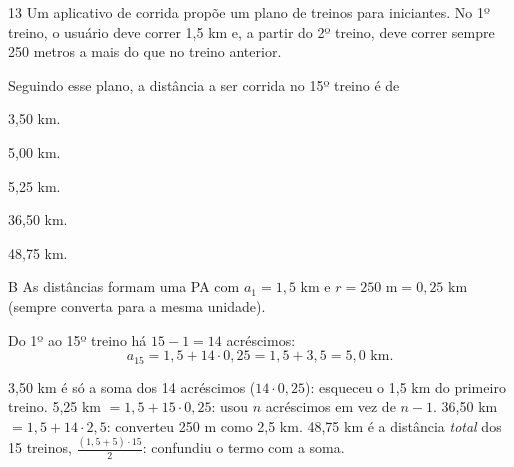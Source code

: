 \begin{questaoinedita}{1}{3}
Um aplicativo de corrida propõe um plano de treinos para iniciantes. No 1º
treino, o usuário deve correr 1,5 km e, a partir do 2º treino, deve correr
sempre 250 metros a mais do que no treino anterior.

Seguindo esse plano, a distância a ser corrida no 15º treino é de
\begin{alternativas}
  \item 3,50 km.
  \item 5,00 km.
  \item 5,25 km.
  \item 36,50 km.
  \item 48,75 km.
\end{alternativas}
\end{questaoinedita}
\begin{resolucao}{B}
 As distâncias formam uma PA com $a_1 = 1{,}5$ km e
$r = 250 \text{ m} = 0{,}25$ km (sempre converta para a mesma unidade).

 Do 1º ao 15º treino há $15 - 1 = 14$ acréscimos:
\[
a_{15} = 1{,}5 + 14 \cdot 0{,}25 = 1{,}5 + 3{,}5 = 5{,}0 \text{ km}.
\]


\begin{distratores}
 3,50 km é só a soma dos 14 acréscimos ($14 \cdot 0{,}25$): esqueceu o
1,5 km do primeiro treino.
 5,25 km $= 1{,}5 + 15 \cdot 0{,}25$: usou $n$ acréscimos em vez de
$n - 1$.
 36,50 km $= 1{,}5 + 14 \cdot 2{,}5$: converteu 250 m como 2,5 km.
 48,75 km é a distância \emph{total} dos 15 treinos,
$\frac{(1{,}5 + 5)\cdot 15}{2}$: confundiu o termo com a soma.
\end{distratores}
\end{resolucao}

